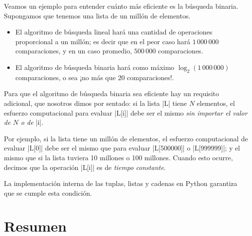 Veamos un ejemplo para entender cuánto más eficiente es la búsqueda binaria.
Supongamos que tenemos una lista de un millón de elementos.

\begin{itemize}
\item El algoritmo de búsqueda lineal hará una cantidad de operaciones proporcional
a un millón; es decir que en el peor caso hará $1\,000\,000$ comparaciones, y en
un caso promedio, $500\,000$ comparaciones.
\item El algoritmo de búsqueda binaria hará como máximo $\log_2(1\,000\,000)$
comparaciones, o sea ¡no más que 20 comparaciones!.
\end{itemize}

\label{lookup-listas}
\begin{sabias_que}
    Para que el algoritmo de búsqueda binaria sea eficiente hay un requisito
    adicional, que nosotros dimos por sentado: si la lista |L| tiene $N$ elementos,
    el esfuerzo computacional para evaluar |L[i]| debe ser el mismo \emph{sin
    importar el valor de $N$ o de} |i|.

    Por ejemplo, si la lista tiene un millón de elementos, el esfuerzo
    computacional de evaluar |L[0]| debe ser el mismo que para evaluar
    |L[500000]| o |L[999999]|; y el mismo que si la lista tuviera 10 millones o
    100 millones.  Cuando esto ocurre, decimos que la operación |L[i]| es de
    \emph{tiempo constante}.

    La implementación interna de las tuplas, listas y cadenas en Python
    garantiza que se cumple esta condición.
\end{sabias_que}

\section{Resumen}

